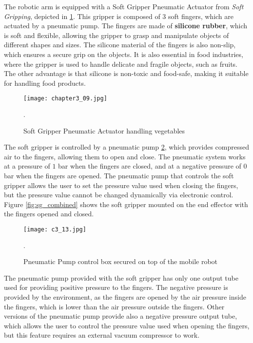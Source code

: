 The robotic arm is equipped with a Soft Gripper Pneumatic Actuator from \textit{Soft Gripping}, depicted in \ref{fig:c3_img09}.
This gripper is composed of 3 soft fingers, which are actuated by a pneumatic pump. The fingers are made of
\textbf{silicone rubber}, which is soft and flexible, allowing the gripper to grasp and manipulate objects of different shapes
and sizes. The silicone material of the fingers is also non-slip, which ensures a secure grip on the objects.
It is also essential in food industries, where the gripper is used to handle delicate and fragile objects, 
such as fruits. The other advantage is that silicone is non-toxic and food-safe, making it suitable for handling
food products.

\begin{figure}[t]
    \centering
    \texttt{[image: chapter3\_09.jpg]}
    \captionsetup{width=1\linewidth}
    \caption{Soft Gripper Pneumatic Actuator handling vegetables}.
    \label{fig:c3_img09}
\end{figure}

The soft gripper is controlled by a pneumatic pump \ref{fig:c3_img13}, which provides compressed air to the fingers,
allowing them to open and close. The pneumatic system works at a pressure of $1$ bar when the fingers are closed, and at
a negative pressure of $0$ bar when the fingers are opened. The pneumatic pump that controls the soft gripper
allows the user to set the pressure value used when closing the fingers, but the pressure value cannot be
changed dynamically via electronic control. Figure \ref{fig:sg_combined} shows the soft gripper mounted on the end effector
with the fingers opened and closed.

\begin{figure}[t]
    \centering
    \texttt{[image: c3\_13.jpg]}
    \captionsetup{width=1\linewidth}
    \caption{Pneumatic Pump control box secured on top of the mobile robot}.
    \label{fig:c3_img13}
\end{figure}

The pneumatic pump provided with the soft gripper has only one output tube used for providing positive pressure
to the fingers. The negative pressure is provided by the environment, as the fingers are opened by the air pressure
inside the fingers, which is lower than the air pressure outside the fingers. 
Other versions of the pneumatic pump provide also a negative pressure output tube, which allows the user to control
the pressure value used when opening the fingers, but this feature requires an external vacuum compressor to work.

